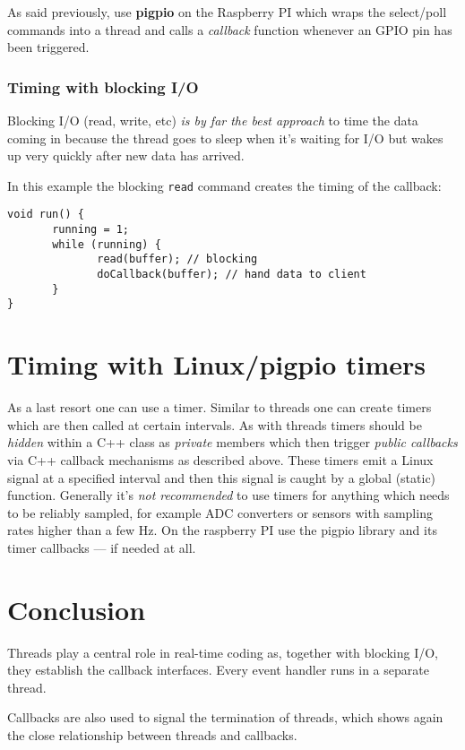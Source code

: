 \documentclass[12pt]{report}
\begin{document}
As said previously, use \textbf{pigpio} on the Raspberry PI
which wraps the select/poll commands into a thread and calls a
\textsl{callback} function whenever an GPIO pin has been triggered.


\subsubsection{Timing with blocking I/O}
Blocking I/O (read, write, etc) \textsl{is by far the best approach} to time
the data coming in because the thread goes to sleep when it's waiting for
I/O but wakes up very quickly after new data has arrived.

In this example the blocking \texttt{read} command creates
the timing of the callback:
\begin{verbatim}
void run() {
       running = 1;
       while (running) {
              read(buffer); // blocking
              doCallback(buffer); // hand data to client
       }
}
\end{verbatim}


\section{Timing with Linux/pigpio timers}
As a last resort one can use a timer. Similar to threads one can
create timers which are then called at certain intervals. As with threads
timers should be \textsl{hidden} within a C++ class as
\textsl{private} members which then trigger \textsl{public callbacks}
via C++ callback mechanisms as described above. These timers emit a
Linux signal at a specified interval and then this signal is caught by
a global (static) function.  Generally it's \textsl{not recommended}
to use timers for anything which needs to be reliably sampled, for
example ADC converters or sensors with sampling rates higher than a
few Hz. On the raspberry PI use the pigpio library and its timer
callbacks --- if needed at all.

\section{Conclusion}
Threads play a central role in real-time coding as,
together with blocking I/O, they establish
the callback interfaces. Every event handler
runs in a separate thread.

Callbacks are also used to signal the termination of
threads, which shows again the close relationship between threads
and callbacks.
\end{document}
